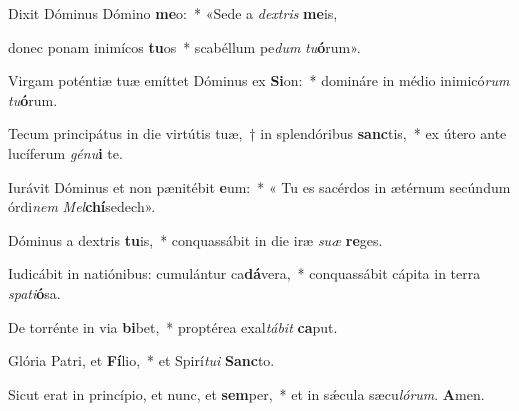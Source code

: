 \item Dixit Dóminus Dómino \textbf{me}o:~* «Sede a \textit{dextris} \textbf{me}is,

\item donec ponam inimícos \textbf{tu}os~* scabéllum pe\textit{dum} \textit{tu}\textbf{ó}rum».

\item Virgam poténtiæ tuæ emíttet Dóminus ex \textbf{Si}on:~* domináre in médio inimicó\textit{rum} \textit{tu}\textbf{ó}rum.

\item Tecum principátus in die virtútis tuæ,~† in splendóribus \textbf{sanc}tis,~* ex útero ante lucíferum \textit{génu}\textbf{i} te.

\item Iurávit Dóminus et non pænitébit \textbf{e}um:~* « Tu es sacérdos in ætérnum secúndum órdi\textit{nem} \textit{Mel}\textbf{chí}sedech».

\item Dóminus a dextris \textbf{tu}is,~* conquassábit in die iræ \textit{suæ} \textbf{re}ges.

\item Iudicábit in natiónibus: cumulántur ca\textbf{dá}vera,~* conquassábit cápita in terra \textit{spati}\textbf{ó}sa.

\item De torrénte in via \textbf{bi}bet,~* proptérea exal\textit{tábit} \textbf{ca}put.

\item Glória Patri, et \textbf{Fí}lio,~* et Spirí\textit{tui} \textbf{Sanc}to.

\item Sicut erat in princípio, et nunc, et \textbf{sem}per,~* et in sǽcula sæcu\textit{lórum}. \textbf{A}men.

